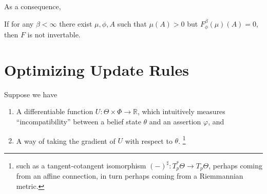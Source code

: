 \documentclass{article}
\begin{document}


As a consequence,
\begin{coro}
    If for any $\beta < \infty$ there exist $\mu, \phi, A$ such that
    $\mu(A) > 0$  but $F^{\beta}_\phi(\mu)(A) = 0$, then $F$ is not invertable.
\end{coro}

%

\section{Optimizing Update Rules}
Suppose we have
\begin{enumerate}[nosep]
    \item A differentiable function $U : \Theta \times \Phi  \to \mathbb R$, which intuitively measures ``incompatibility'' between a belief state $\theta$ and an assertion $\varphi$, and
    \item
        A way of taking the gradient of $U$ with respect to $\theta$.%
            \footnote{
            such as a tangent-cotangent isomorphism $(-)^\sharp : T^*_p\Theta \to T_p \Theta$, perhaps coming from an affine connection, in turn perhaps coming from a Riemmannian metric.}
\end{enumerate}
\def\GD#1{\mathtt{GF}[#1]}
\def\NGD#1{\mathtt{NGF}[#1]}
\end{document}
